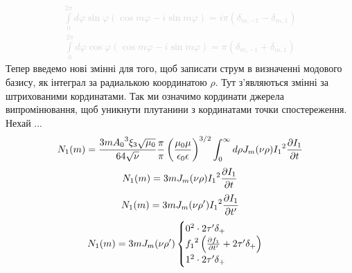 %
\textcolor{lightgray} { \begin{equation*} \begin{aligned}
\int \limits_{0}^{2\pi} d \varphi \sin \varphi 
\left( \cos m \varphi - i \sin m \varphi \right) = 
i \pi \left( \delta_{m,-1} - \delta_{m,1} \right)
\end{aligned} \end{equation*} }
%
\textcolor{lightgray} { \begin{equation*} \begin{aligned}
\int \limits_{0}^{2\pi} d \varphi \cos \varphi 
( \cos m \varphi - i \sin m \varphi) = \pi ( \delta_{m,-1} + \delta_{m,1} )
\end{aligned} \end{equation*} }
%
Тепер введемо нові змінні для того, щоб записати струм в визначенні модового 
базису, як інтеграл за радиалькою координатою $ \rho $. Тут з'являються змінні
за штрихованими кординатами. Так ми означимо кординати джерела випромінювання,
щоб уникнути плутанини з кординатами точки спостереження. Нехай ...
%
\textcolor{lightgray} { \begin{equation*} \begin{aligned}
N_1 (m) =  \frac{3 m {A_0}^3 \xi_3 \sqrt{\mu_0}}{64 \sqrt{\nu}} \frac{\pi}{\pi}
\left( \frac{\mu_0 \mu} {\epsilon_0 \epsilon} \right)^{3/2} 
\int_{0}^{\infty} d \rho 
J_m (\nu \rho) {I_1}^2 \frac{\partial I_1}{\partial t}
\end{aligned} \end{equation*} }
%
\textcolor{lightgray} { \begin{equation*} \begin{aligned}
N_1 (m) =  3 m J_m (\nu \rho) {I_1}^2 \frac{\partial I_1}{\partial t}
\end{aligned} \end{equation*} }
%
\begin{equation*} \begin{aligned}
N_1 (m) =  3 m J_m (\nu \rho') {I_1}^2 \frac{\partial I_1}{\partial t'}
\end{aligned} \end{equation*}
%
\textcolor{lightgray} { \begin{equation*} \begin{aligned}
N_1 (m) =  3 m J_m (\nu \rho') \begin{cases}
0^2 \cdot 2 \tau' \delta_+ \\
{f_1}^2 \left( \frac{\partial f_1}{\partial t'} + 2 \tau' \delta_+ \right) \\
1^2 \cdot 2 \tau' \delta_+
\end{cases} \end{aligned} \end{equation*} }
